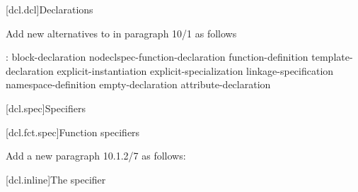 \setcounter{chapter}{9}
[dcl.dcl]{Declarations}%


\noindent
Add new alternatives to  in paragraph 10/1 as follows
\begin{std.txt}
  \begin{bnf}
    :\br
      block-declaration\br
      nodeclspec-function-declaration\br
      function-definition\br
      template-declaration\br
      explicit-instantiation\br
      explicit-specialization\br
      linkage-specification\br
      namespace-definition\br
      empty-declaration\br
      attribute-declaration\br
      \color{addclr}
  \end{bnf}
  \end{std.txt}


\setcounter{section}{0}
[dcl.spec]{Specifiers}%

\setcounter{subsection}{1}
[dcl.fct.spec]{Function specifiers}%

\noindent
Add a new paragraph 10.1.2/7 as follows:
\begin{std.txt}
  \color{addclr}
  \resetalinea[6]
  \alinea
\end{std.txt}


\setcounter{subsection}{5}
[dcl.inline]{The  specifier}%

